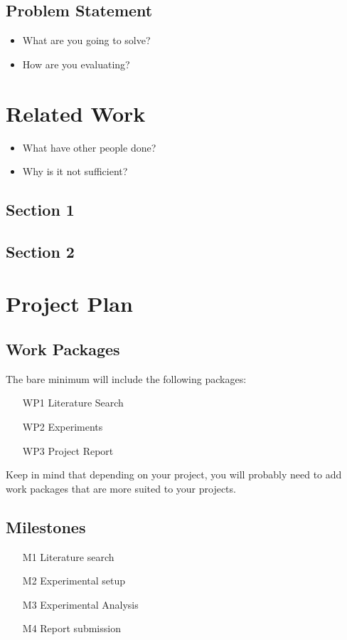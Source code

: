 \documentclass[rnd]{mas_proposal}
\begin{document}
\section{Problem Statement}
\begin{itemize}
    \item What are you going to solve?
    \item How are you evaluating?
\end{itemize}


\chapter{Related Work}
\begin{itemize}
    \item What have other people done?
    \item Why is it not sufficient?
\end{itemize}

\section{Section 1}
\section{Section 2}



\chapter{Project Plan}

\section{Work Packages}
The bare minimum will include the following packages:
\begin{enumerate}
    \item[WP1] Literature Search
    \item[WP2] Experiments
    \item[WP3] Project Report
\end{enumerate}
Keep in mind that depending on your project, you will probably need to add work packages that are more suited to your projects.

\section{Milestones}
\begin{enumerate}
    \item[M1] Literature search
    \item[M2] Experimental setup
    \item[M3] Experimental Analysis
    \item[M4] Report submission
\end{enumerate}
\end{document}
